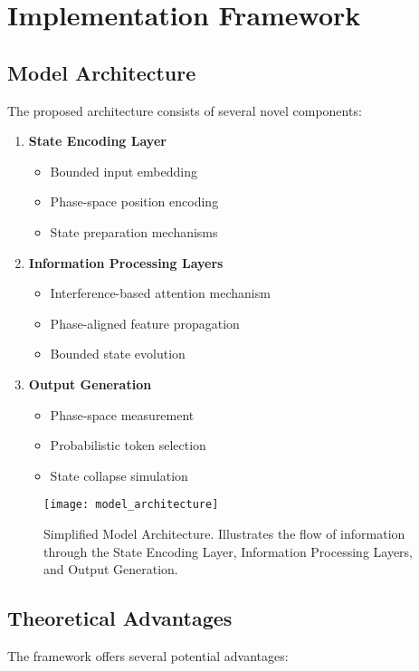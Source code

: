 \documentclass[twocolumn]{article}
\begin{document}
\section{Implementation Framework}

\subsection{Model Architecture}
The proposed architecture consists of several novel components:

\begin{enumerate}
    \item \textbf{State Encoding Layer}
    \begin{itemize}
        \item Bounded input embedding
        \item Phase-space position encoding
        \item State preparation mechanisms
    \end{itemize}

    \item \textbf{Information Processing Layers}
    \begin{itemize}
        \item Interference-based attention mechanism
        \item Phase-aligned feature propagation
        \item Bounded state evolution
    \end{itemize}

    \item \textbf{Output Generation}
    \begin{itemize}
        \item Phase-space measurement
        \item Probabilistic token selection
        \item State collapse simulation
    \end{itemize}
\end{enumerate}

\begin{figure}[h]
    \centering
    \texttt{[image: model\_architecture]}
    \caption{Simplified Model Architecture. Illustrates the flow of information through the State Encoding Layer, Information Processing Layers, and Output Generation.}
\end{figure}

\subsection{Theoretical Advantages}
The framework offers several potential advantages:
\end{document}
